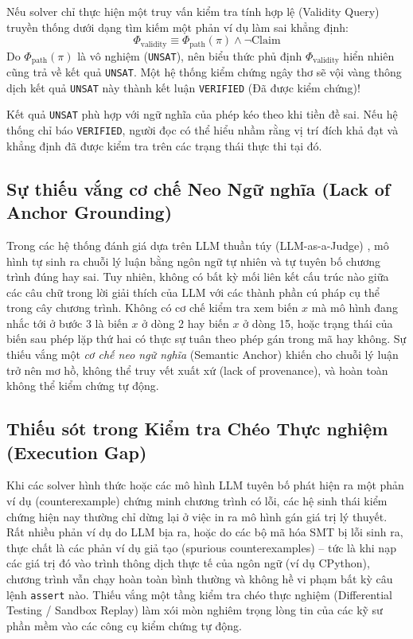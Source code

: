 Nếu solver chỉ thực hiện một truy vấn kiểm tra tính hợp lệ (Validity Query) truyền thống dưới dạng tìm kiếm một phản ví dụ làm sai khẳng định:
\begin{equation}
\Phi_{\text{validity}} \equiv \Phi_{\text{path}}(\pi) \land \neg \text{Claim}
\end{equation}
Do $\Phi_{\text{path}}(\pi)$ là vô nghiệm (\texttt{UNSAT}), nên biểu thức phủ định $\Phi_{\text{validity}}$ hiển nhiên cũng trả về kết quả \texttt{UNSAT}. Một hệ thống kiểm chứng ngây thơ sẽ vội vàng thông dịch kết quả \texttt{UNSAT} này thành kết luận \texttt{VERIFIED} (Đã được kiểm chứng)! 

Kết quả \texttt{UNSAT} phù hợp với ngữ nghĩa của phép kéo theo khi tiền đề sai. Nếu hệ thống chỉ báo \texttt{VERIFIED}, người đọc có thể hiểu nhầm rằng vị trí đích khả đạt và khẳng định đã được kiểm tra trên các trạng thái thực thi tại đó.

\subsection{Sự thiếu vắng cơ chế Neo Ngữ nghĩa (Lack of Anchor Grounding)}
Trong các hệ thống đánh giá dựa trên LLM thuần túy (LLM-as-a-Judge) \cite{gu2024cruxeval}, mô hình tự sinh ra chuỗi lý luận bằng ngôn ngữ tự nhiên và tự tuyên bố chương trình đúng hay sai. Tuy nhiên, không có bất kỳ mối liên kết cấu trúc nào giữa các câu chữ trong lời giải thích của LLM với các thành phần cú pháp cụ thể trong cây chương trình. Không có cơ chế kiểm tra xem biến $x$ mà mô hình đang nhắc tới ở bước 3 là biến $x$ ở dòng 2 hay biến $x$ ở dòng 15, hoặc trạng thái của biến sau phép lặp thứ hai có thực sự tuân theo phép gán trong mã hay không. Sự thiếu vắng một \textit{cơ chế neo ngữ nghĩa} (Semantic Anchor) khiến cho chuỗi lý luận trở nên mơ hồ, không thể truy vết xuất xứ (lack of provenance), và hoàn toàn không thể kiểm chứng tự động.

\subsection{Thiếu sót trong Kiểm tra Chéo Thực nghiệm (Execution Gap)}
Khi các solver hình thức hoặc các mô hình LLM tuyên bố phát hiện ra một phản ví dụ (counterexample) chứng minh chương trình có lỗi, các hệ sinh thái kiểm chứng hiện nay thường chỉ dừng lại ở việc in ra mô hình gán giá trị lý thuyết. Rất nhiều phản ví dụ do LLM bịa ra, hoặc do các bộ mã hóa SMT bị lỗi sinh ra, thực chất là các phản ví dụ giả tạo (spurious counterexamples) -- tức là khi nạp các giá trị đó vào trình thông dịch thực tế của ngôn ngữ (ví dụ CPython), chương trình vẫn chạy hoàn toàn bình thường và không hề vi phạm bất kỳ câu lệnh \texttt{assert} nào. Thiếu vắng một tầng kiểm tra chéo thực nghiệm (Differential Testing / Sandbox Replay) làm xói mòn nghiêm trọng lòng tin của các kỹ sư phần mềm vào các công cụ kiểm chứng tự động.


